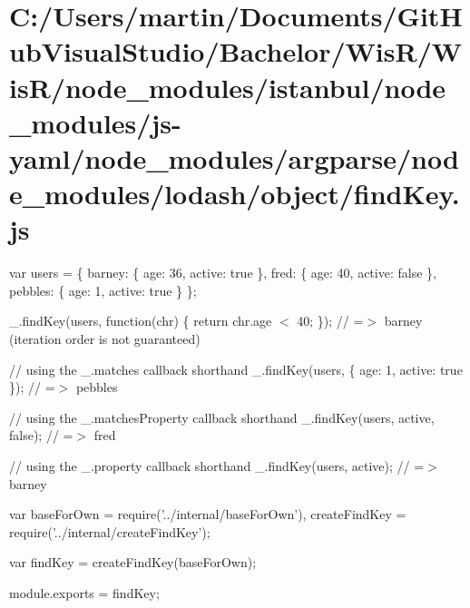 \hypertarget{_c_1_2_users_2martin_2_documents_2_git_hub_visual_studio_2_bachelor_2_wis_r_2_wis_r_2node_moduleb8185989c62712b493bc5b9679a07fd8}{}\section{C\+:/\+Users/martin/\+Documents/\+Git\+Hub\+Visual\+Studio/\+Bachelor/\+Wis\+R/\+Wis\+R/node\+\_\+modules/istanbul/node\+\_\+modules/js-\/yaml/node\+\_\+modules/argparse/node\+\_\+modules/lodash/object/find\+Key.\+js}
var users = \{ \textquotesingle{}barney\textquotesingle{}\+: \{ \textquotesingle{}age\textquotesingle{}\+: 36, \textquotesingle{}active\textquotesingle{}\+: true \}, \textquotesingle{}fred\textquotesingle{}\+: \{ \textquotesingle{}age\textquotesingle{}\+: 40, \textquotesingle{}active\textquotesingle{}\+: false \}, \textquotesingle{}pebbles\textquotesingle{}\+: \{ \textquotesingle{}age\textquotesingle{}\+: 1, \textquotesingle{}active\textquotesingle{}\+: true \} \};

\+\_\+.\+find\+Key(users, function(chr) \{ return chr.\+age $<$ 40; \}); // =$>$ \textquotesingle{}barney\textquotesingle{} (iteration order is not guaranteed)

// using the {\ttfamily \+\_\+.\+matches} callback shorthand \+\_\+.\+find\+Key(users, \{ \textquotesingle{}age\textquotesingle{}\+: 1, \textquotesingle{}active\textquotesingle{}\+: true \}); // =$>$ \textquotesingle{}pebbles\textquotesingle{}

// using the {\ttfamily \+\_\+.\+matches\+Property} callback shorthand \+\_\+.\+find\+Key(users, \textquotesingle{}active\textquotesingle{}, false); // =$>$ \textquotesingle{}fred\textquotesingle{}

// using the {\ttfamily \+\_\+.\+property} callback shorthand \+\_\+.\+find\+Key(users, \textquotesingle{}active\textquotesingle{}); // =$>$ \textquotesingle{}barney\textquotesingle{}


\begin{DoxyCodeInclude}
var baseForOwn = require(\textcolor{stringliteral}{'../internal/baseForOwn'}),
    createFindKey = require(\textcolor{stringliteral}{'../internal/createFindKey'});

var findKey = createFindKey(baseForOwn);

module.exports = findKey;
\end{DoxyCodeInclude}
 